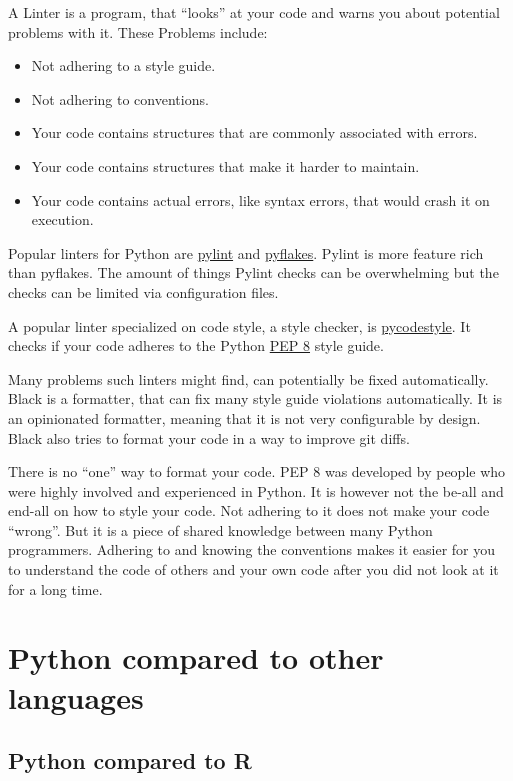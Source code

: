 \documentclass{article}
\begin{document}
A Linter is a program, that ``looks'' at your code and warns you about potential
problems with it. These Problems include:
\begin{itemize}
    \item Not adhering to a style guide.
    \item Not adhering to conventions.
    \item Your code contains structures that are commonly associated with errors.
    \item Your code contains structures that make it harder to maintain.
    \item Your code contains actual errors, like syntax errors, that would crash it on execution.
\end{itemize}

Popular linters for Python are \href{https://github.com/PyCQA/pylint}{pylint} and
\href{https://github.com/PyCQA/pyflakes}{pyflakes}.
Pylint is more feature rich than pyflakes.
The amount of things Pylint checks can be overwhelming but the checks can be limited
via configuration files.

A popular linter specialized on code style, a style checker,
is \href{https://github.com/PyCQA/pycodestyle}{pycodestyle}.
It checks if your code adheres to the Python
\href{https://www.python.org/dev/peps/pep-0008/}{PEP 8} style guide.

Many problems such linters might find, can potentially be fixed automatically.
Black is a formatter, that can fix many style guide violations automatically.
It is an opinionated formatter, meaning that it is not very configurable by design.
Black also tries to format your code in a way to improve git diffs.

There is no ``one'' way to format your code.
PEP 8 was developed by people who were highly involved and experienced in Python.
It is however not the be-all and end-all on how to style your code.
Not adhering to it does not make your code ``wrong''.
But it is a piece of shared knowledge between many Python programmers.
Adhering to and knowing the conventions makes it easier for you to understand
the code of others and your own code after you did not look at it for a long time.

\section{Python compared to other languages}

\subsection{Python compared to R}
\end{document}
